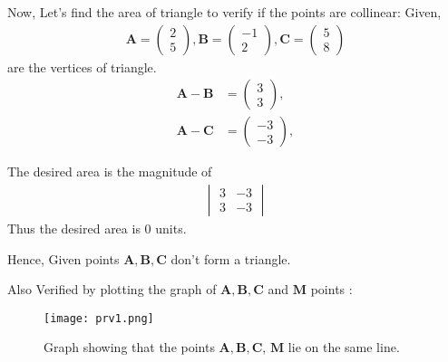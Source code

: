 \documentclass[journal,12pt,twocolumn]{IEEEtran}
\let\vec\mathbf
\newcommand{\mydet}[1]{\ensuremath{\begin{vmatrix}#1\end{vmatrix}}}
\newcommand{\myvec}[1]{\ensuremath{\begin{pmatrix}#1\end{pmatrix}}}
\begin{document}
    Now, Let's find the area of triangle to verify if the points are collinear:
    Given, 
    \begin{align}
		\vec{A} = \myvec{2 \\ 5} ,
		\vec{B} = \myvec{-1 \\ 2},
		\vec{C} = \myvec{5 \\ 8}
	\end{align}
	are the vertices of triangle.
	\begin{align}
	\vec{A}-\vec{B} &= \myvec{3 \\3},\\
	\vec{A}-\vec{C} &= \myvec{-3 \\-3},
	\end{align}
	
	The desired area is  the magnitude of 
    \begin{align}
     \mydet{3 & -3\\3 & -3} 
    \end{align}
    Thus the desired area is 0 units.
	
    \large Hence, Given points $\vec{A,B,C}$ don't form a triangle.

    \large Also Verified by plotting the graph of $\vec{A,B,C}$ and $\vec{M}$ points :

  	\begin{figure}[!ht]
		\centering
		\texttt{[image: prv1.png]}
		\caption{\large Graph showing that the points  $\vec{A}, \vec{B}, \vec{C}$, $\vec{M}$ lie on the same line.}
	\end{figure}
	
\end{document}
